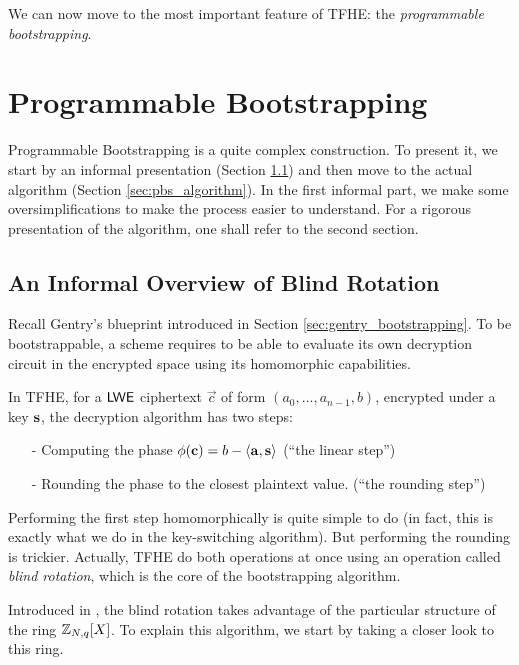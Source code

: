 We can now move to the most important feature of TFHE: the \textit{programmable bootstrapping}.

\section{Programmable Bootstrapping}
\label{sec:pbs}

Programmable Bootstrapping is a quite complex construction. To present it, we start by an informal presentation (Section \ref{sec:overview_blind_rotation}) and then move to the actual algorithm (Section \ref{sec:pbs_algorithm}). In the first informal part, we make some oversimplifications to make the process easier to understand. For a rigorous presentation of the algorithm, one shall refer to the second section.

\subsection{An Informal Overview of Blind Rotation}
\label{sec:overview_blind_rotation}

Recall Gentry's blueprint introduced in Section \ref{sec:gentry_bootstrapping}. To be bootstrappable, a scheme requires to be able to evaluate its own decryption circuit in the encrypted space using its homomorphic capabilities.

In TFHE, for a $\textsf{LWE}$ ciphertext $\vec c$ of form $(a_0, \dots, a_{n-1}, b)$, encrypted under a key $\mathbf s$, the decryption algorithm has two steps:
\begin{itemize}
	\item[-] Computing the phase $\phi(\mathbf c) = b - \left \langle \mathbf a, \mathbf s \right \rangle$ (``the linear step'')
	\item[-] Rounding the phase to the closest plaintext value. (``the rounding step'')
\end{itemize}

Performing the first step homomorphically is quite simple to do (in fact, this is exactly what we do in the key-switching algorithm). But performing the rounding is trickier. Actually, TFHE do both operations at once using an operation called \textit{blind rotation}, which is the core of the bootstrapping algorithm. 

Introduced in \cite{EC:DucMic15}, the blind rotation takes advantage of the particular structure of the ring $\mathbb{Z}_{N,q}[X]$. To explain this algorithm, we start by taking a closer look to this ring.




